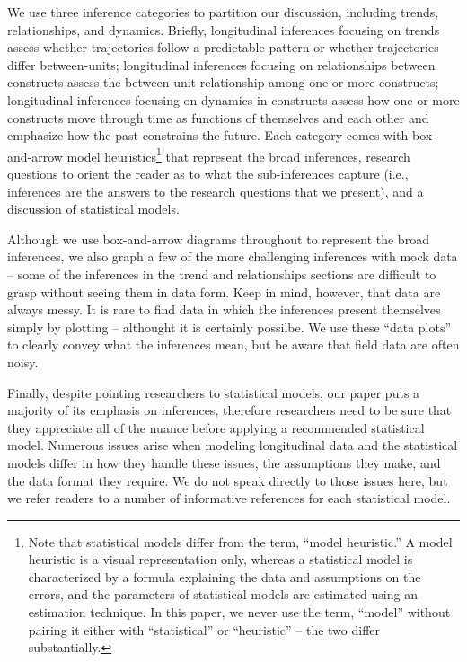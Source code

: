 \documentclass[english,,man]{apa6}
\let\rmarkdownfootnote\footnote%
\def\footnote{\protect\rmarkdownfootnote}
\theoremstyle{definition}
\theoremstyle{definition}
\theoremstyle{definition}
\theoremstyle{remark}
\begin{document}
We use three inference categories to partition our discussion, including
trends, relationships, and dynamics. Briefly, longitudinal inferences
focusing on trends assess whether trajectories follow a predictable
pattern or whether trajectories differ between-units; longitudinal
inferences focusing on relationships between constructs assess the
between-unit relationship among one or more constructs; longitudinal
inferences focusing on dynamics in constructs assess how one or more
constructs move through time as functions of themselves and each other
and emphasize how the past constrains the future. Each category comes
with box-and-arrow model heuristics\footnote{Note that statistical
  models differ from the term, \enquote{model heuristic.} A model
  heuristic is a visual representation only, whereas a statistical model
  is characterized by a formula explaining the data and assumptions on
  the errors, and the parameters of statistical models are estimated
  using an estimation technique. In this paper, we never use the term,
  \enquote{model} without pairing it either with \enquote{statistical}
  or \enquote{heuristic} -- the two differ substantially.} that
represent the broad inferences, research questions to orient the reader
as to what the sub-inferences capture (i.e., inferences are the answers
to the research questions that we present), and a discussion of
statistical models.

Although we use box-and-arrow diagrams throughout to represent the broad
inferences, we also graph a few of the more challenging inferences with
mock data -- some of the inferences in the trend and relationships
sections are difficult to grasp without seeing them in data form. Keep
in mind, however, that data are always messy. It is rare to find data in
which the inferences present themselves simply by plotting -- althought
it is certainly possilbe. We use these \enquote{data plots} to clearly
convey what the inferences mean, but be aware that field data are often
noisy.

Finally, despite pointing researchers to statistical models, our paper
puts a majority of its emphasis on inferences, therefore researchers
need to be sure that they appreciate all of the nuance before applying a
recommended statistical model. Numerous issues arise when modeling
longitudinal data and the statistical models differ in how they handle
these issues, the assumptions they make, and the data format they
require. We do not speak directly to those issues here, but we refer
readers to a number of informative references for each statistical
model.
\end{document}
